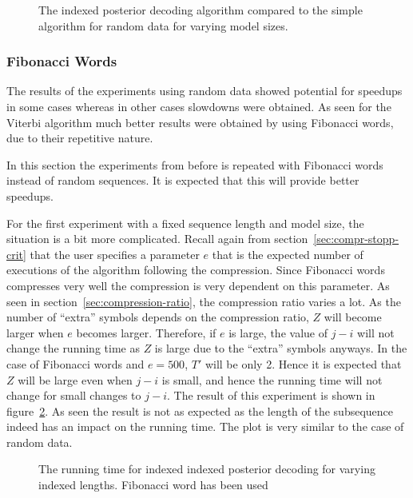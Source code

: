 \begin{figure}
  \centering
  
  \caption{The indexed posterior decoding algorithm compared to the simple
    algorithm for random data for varying model sizes.}
  \label{fig:indexed_posterior_speedup_vs_N}
\end{figure}

\subsubsection{Fibonacci Words}

The results of the experiments using random data showed potential for speedups
in some cases whereas in other cases slowdowns were obtained. As seen for the
Viterbi algorithm much better results were obtained by using Fibonacci words,
due to their repetitive nature.

In this section the experiments from before is repeated with Fibonacci words
instead of random sequences. It is expected that this will provide better
speedups.

For the first experiment with a fixed sequence length and model size, the
situation is a bit more complicated. Recall again from
section~\ref{sec:compr-stopp-crit} that the user specifies a parameter $e$ that
is the expected number of executions of the algorithm following the
compression. Since Fibonacci words compresses very well the compression is very
dependent on this parameter. As seen in section~\ref{sec:compression-ratio},
the compression ratio varies a lot.  As the number of
``extra'' symbols depends on the compression ratio, $Z$ will become larger when
$e$ becomes larger. Therefore, if $e$ is large, the value of $j - i$ will not
change the running time as $Z$ is large due to the ``extra'' symbols anyways.
In the case of Fibonacci words and $e = 500$, $T'$ will be only 2. Hence it is
expected that $Z$ will be large even when $j - i$ is small, and hence the
running time will not change for small changes to $j - i$. The result of this
experiment is shown in
figure~\ref{fig:assymptotic_indexed_posterior_fib_subseq_length.tex}. As seen
the result is not as expected as the length of the subsequence indeed has an
impact on the running time. The plot is very similar to the case of random
data. 

\begin{figure}
  \centering
  
  \caption{The running time for indexed indexed posterior decoding for
    varying indexed lengths. Fibonacci word has been used}
  \label{fig:assymptotic_indexed_posterior_fib_subseq_length.tex}
\end{figure}

